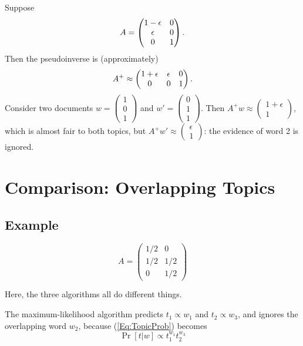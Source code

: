 \documentclass{article}
\begin{document}
Suppose
\[
    A =
    \begin{pmatrix}
        1 - \epsilon & 0
    \\  \epsilon     & 0
    \\  0            & 1
    \end{pmatrix}
    \ldotp
\]
Then the pseudoinverse is (approximately)
\[
    A^+ \approx
    \begin{pmatrix}
        1 + \epsilon & \epsilon & 0
    \\  0            & 0        & 1
    \end{pmatrix}
    \ldotp
\]
Consider two documents \(w = \begin{pmatrix} 1 \\ 0 \\ 1 \end{pmatrix}\) and  \(w' = \begin{pmatrix} 0 \\ 1 \\ 1 \end{pmatrix}\).
Then \(A^+ w \approx \begin{pmatrix} 1 + \epsilon \\ 1 \end{pmatrix}\), which is almost fair to both topics, but \(A^+ w' \approx \begin{pmatrix} \epsilon \\ 1 \end{pmatrix}\): the evidence of word 2 is ignored.

\section{Comparison: Overlapping Topics}

\subsection{Example}

\[
    A =
    \begin{pmatrix}
        1/2 & 0
    \\  1/2 & 1/2
    \\  0   & 1/2
    \end{pmatrix}
\]

Here, the three algorithms all do different things.

The maximum-likelihood algorithm predicts \(t_1 \propto w_1\) and \(t_2 \propto w_3\), and ignores the overlapping word \(w_2\), because (\ref{Eq:TopicProb}) becomes
\[ \Pr[t | w] \propto t_1^{w_1} t_2^{w_3} \]
\end{document}
